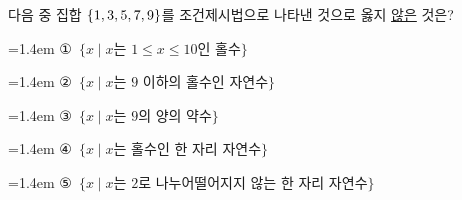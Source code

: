 다음 중 집합 $\{1{,}\mkern3mu\mathopen{}3{,}\mkern3mu\mathopen{}5{,}\mkern3mu\mathopen{}7{,}\mkern3mu\mathopen{}9\}$를 조건제시법으로 나타낸 것으로 옳지 \underline{않은} 것은?
\par\medskip\par\noindent\hangindent=1.4em {\small ①}\ $\{x \mid x$는 $1\le x\le 10$인 홀수$\}$\par\noindent\hangindent=1.4em {\small ②}\ $\{x \mid x$는 $9$ 이하의 홀수인 자연수$\}$\par\noindent\hangindent=1.4em {\small ③}\ $\{x \mid x$는 $9$의 양의 약수$\}$\par\noindent\hangindent=1.4em {\small ④}\ $\{x \mid x$는 홀수인 한 자리 자연수$\}$\par\noindent\hangindent=1.4em {\small ⑤}\ $\{x \mid x$는 $2$로 나누어떨어지지 않는 한 자리 자연수$\}$\par\medskip

